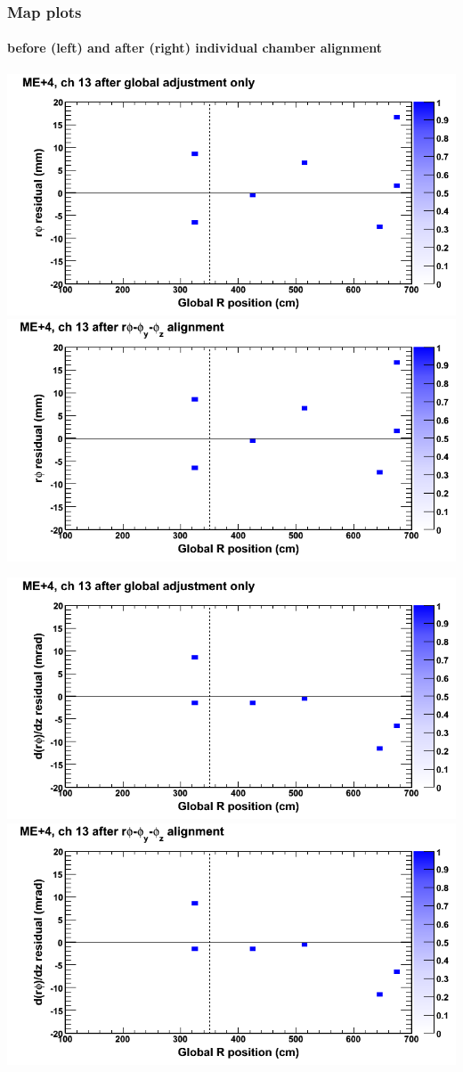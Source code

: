 \documentclass[compress]{beamer}
\begin{document}
\begin{frame}
\frametitle{Map plots}
\framesubtitle{before (left) and after (right) individual chamber alignment}
\includegraphics[width=0.5\linewidth]{ringmapplots_3dof/before_CSCvsr_mep4ch13_x.png} \includegraphics[width=0.5\linewidth]{ringmapplots_3dof/after_CSCvsr_mep4ch13_x.png}

\includegraphics[width=0.5\linewidth]{ringmapplots_3dof/before_CSCvsr_mep4ch13_dxdz.png} \includegraphics[width=0.5\linewidth]{ringmapplots_3dof/after_CSCvsr_mep4ch13_dxdz.png}
\end{frame}
\end{document}
